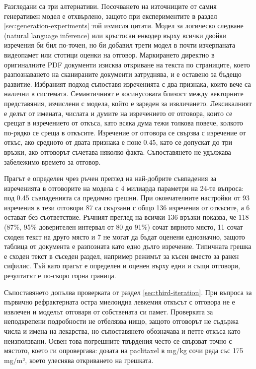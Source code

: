 \documentclass[12pt,a4paper]{article}
\makeatletter
\renewcommand\paragraph{\@startsection{paragraph}{4}{\z@}{1.5ex \@plus .5ex \@minus .2ex}{-1em}{\normalfont\normalsize\bfseries}}
\makeatother
\begin{document}
Разгледани са три алтернативи. Посочването на източниците от самия генеративен модел е отхвърлено, защото при експериментите в раздел \ref{sec:generation-experiments} той измисля цитати. Модел за логическо следване (natural language inference) или кръстосан енкодер върху всички двойки изречения би бил по-точен, но би добавил трети модел в почти изчерпаната видеопамет или стотици оценки на отговор. Маркирането директно в оригиналните PDF документи изисква откриване на текста по страниците, което разпознаването на сканираните документи затруднява, и е оставено за бъдещо развитие. Избраният подход съпоставя изреченията с два признака, които вече са налични в системата. Семантичният е косинусовата близост между векторните представяния, изчислени с модела, който е зареден за извличането. Лексикалният е делът от имената, числата и думите на изречението от отговора, които се срещат в изречението от откъса, като всяка дума тежи толкова повече, колкото по-рядко се среща в откъсите. Изречение от отговора се свързва с изречение от откъс, ако средното от двата признака е поне 0.45, като се допускат до три връзки, ако отговорът съчетава няколко факта. Съпоставянето не удължава забележимо времето за отговор.

\paragraph{Оценка.} Прагът е определен чрез ръчен преглед на най-добрите съвпадения за изреченията в отговорите на модела с 4 милиарда параметри на 24-те въпроса: под 0.45 съвпаденията са предимно грешни. При окончателните настройки от 93 изречения в тези отговори 87 са свързани с общо 136 изречения от откъсите, а 6 остават без съответствие. Ръчният преглед на всички 136 връзки показва, че 118 (87\%, 95\% доверителен интервал от 80 до 91\%) сочат вярното място, 11 сочат сходен текст на друго място и 7 не могат да бъдат оценени еднозначно, защото таблица от документа е разпозната като едно дълго изречение. Типичната грешка е сходен текст в съседен раздел, например режимът за късен вместо за ранен сифилис. Тъй като прагът е определен и оценен върху едни и същи отговори, резултатът е по-скоро горна граница.

\paragraph{Полза.} Съпоставянето допълва проверката от раздел \ref{sec:third-iteration}. При въпроса за първично рефрактерната остра миелоидна левкемия откъсът с отговора не е извлечен и моделът отговаря от собствената си памет. Проверката за неподкрепени подробности не отбелязва нищо, защото отговорът не съдържа числа и имена на лекарства, но съпоставянето обозначава и петте откъса като неизползвани. Освен това погрешните твърдения често се свързват точно с мястото, което ги опровергава: дозата на paclitaxel в mg/kg сочи реда със 175 mg/m², което улеснява откриването на грешката.
\end{document}
